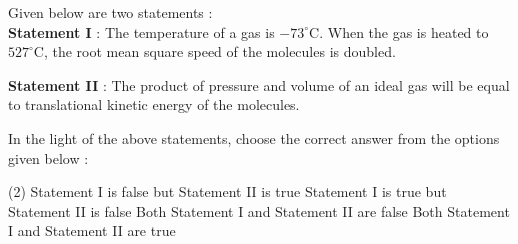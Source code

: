 \item Given below are two statements :\\
    \textbf{Statement I} : The temperature of a gas is $-73^\circ$C. When the gas is heated to $527^\circ$C, the root mean square speed of the molecules is doubled.

    \textbf{Statement II} : The product of pressure and volume of an ideal gas will be equal to translational kinetic energy of the molecules.

    In the light of the above statements, choose the correct answer from the options given below :
    \begin{tasks}(2)
        \task Statement I is false but Statement II is true
        \task Statement I is true but Statement II is false
        \task Both Statement I and Statement II are false
        \task Both Statement I and Statement II are true
    \end{tasks}